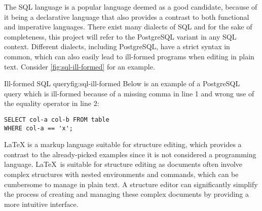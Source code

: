 The SQL language is a popular language deemed as a good candidate, because of it being a declarative language that also provides a contrast to both functional and imperative languages. There exist many dialects of SQL and for the sake of completeness, this project will refer to the PostgreSQL\cite{postgresql-about} variant in any SQL context. Different dialects, including PostgreSQL, have a strict syntax in common, which can also easily lead to ill-formed programs when editing in plain text. Consider \cref{fig:sql-ill-formed} for an example.

\begin{myfigure}{Ill-formed SQL query}{fig:sql-ill-formed}
    Below is an example of a PostgreSQL query which is ill-formed because of a missing comma in line 1 and wrong use of the equality operator in line 2:
    \begin{lstlisting}[style=figurestyle]
SELECT col-a col-b FROM table
WHERE col-a == 'x';
\end{lstlisting}
\end{myfigure}

\LaTeX\cite{latex-about} is a markup language suitable for structure editing, which provides a contrast to the already-picked examples since it is not considered a programming language. \LaTeX\ is suitable for structure editing
as documents often involve complex structures with nested environments and commands, which can be cumbersome to manage in plain text. A structure editor can significantly simplify the process of creating and managing these complex documents by providing a more intuitive interface.
